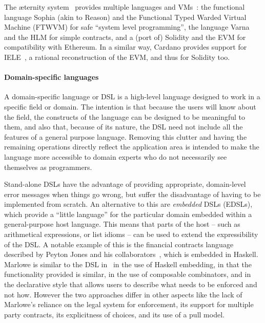\documentclass[runningheads]{llncs}
\begin{document}
The \ae{}ternity system~\cite{aeternity} provides multiple languages and VMs~\cite{Stenman-CODE-BEAM}: the functional 
language  Sophia (akin to Reason) and the Functional Typed Warded Virtual Machine (FTWVM) for safe ``system level 
programming'', the language Varna and the HLM for simple contracts, and a (port of) Solidity and the EVM for 
compatibility with Ethereum. In a similar way, Cardano provides support for IELE~\cite{IELE}, a rational reconstruction 
of the EVM, and thus for Solidity too. 

\paragraph{Domain-specific languages} 

A domain-specific language or DSL is a high-level language designed to work in a specific field or domain. The intention 
is that because the users will know about the field, the constructs of the language can be designed to be meaningful to 
them, and also that, because of its nature, the DSL need not include all the features of a general purpose language. 
Removing this clutter and having the remaining operations directly reflect the application area is intended to make the 
language more accessible to domain experts who do not necessarily see themselves as programmers.

Stand-alone DSLs have the advantage of providing appropriate, domain-level error messages when things go wrong, but 
suffer the disadvantage of having to be implemented from scratch. An alternative to this are \emph{embedded} DSLs 
(EDSLs), which provide a ``little language'' for the particular domain embedded within a general-purpose host language. 
This means that parts of the host -- such as arithmetical expressions, or list idioms --  can be used to extend the 
expressibility of the DSL. A notable example of this is the financial contracts language described by Peyton Jones and 
his collaborators~\cite{PeytonJones:2000}, which is embedded in Haskell. Marlowe is similar to the 
DSL in~\cite{PeytonJones:2000} in the use of Haskell embedding, in that the functionality provided is similar, in the use of 
composable combinators, and in the declarative style that allows users to describe what needs to be enforced and not how. 
However the two approaches differ in other aspects like the lack of Marlowe's reliance on the legal system for 
enforcement, its support for multiple party contracts, its explicitness of choices, and its use of a pull model.
\end{document}
